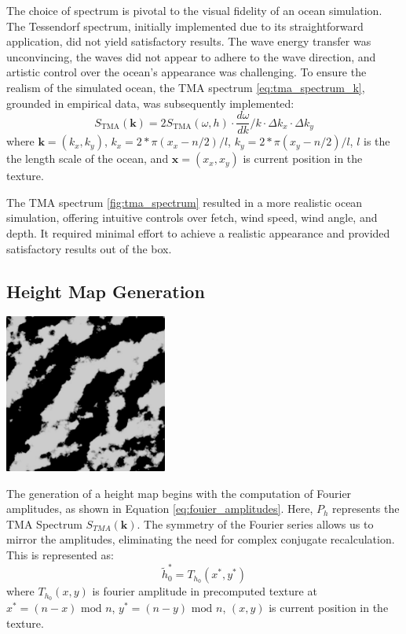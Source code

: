 The choice of spectrum is pivotal to the visual fidelity of an ocean simulation. The Tessendorf spectrum, initially implemented due to its straightforward application, did not yield satisfactory results. The wave energy transfer was unconvincing, the waves did not appear to adhere to the wave direction, and artistic control over the ocean's appearance was challenging. To ensure the realism of the simulated ocean, the TMA spectrum \ref{eq:tma_spectrum_k}, grounded in empirical data, was subsequently implemented:
$$
    S_{\text{TMA}}(\mathbf{k}) = 2S_{\text{TMA}}(\omega, h) \cdot \frac{d\omega}{dk} / k \cdot \Delta k_x \cdot \Delta k_y
$$
where $\mathbf{k} = (k_x, k_y)$, $k_x = 2 * \pi (x_x - n/2)/ l$, $k_y = 2 * \pi (x_y - n/2)/ l$, $l$ is the the length scale of the ocean, 
and $\mathbf{x} = (x_x, x_y)$ is current position in the texture. 

The TMA spectrum \ref{fig:tma_spectrum} resulted in a more realistic ocean simulation, offering intuitive controls over fetch, wind speed, wind angle, and depth. It required minimal effort to achieve a realistic appearance and provided satisfactory results out of the box.

\subsection{Height Map Generation}

\begin{minipage}{1\textwidth}
    \centering
    \includegraphics[width=0.40\textwidth]{"images/tma_height.png"}
    \label{fig:tma_height_map}
\end{minipage}

The generation of a height map begins with the computation of Fourier amplitudes, as shown in Equation \ref{eq:fouier_amplitudes}. Here, $P_h$ represents the TMA Spectrum $S_{TMA}(\mathbf{k})$.
The symmetry of the Fourier series allows us to mirror the amplitudes, eliminating the need for complex conjugate recalculation. This is represented as:
\begin{equation}
    \tilde{h}^{*}_0 = T_{h_0}(x^{*}, y^{*})
\end{equation}
where $T_{h_0}(x, y)$ is fourier amplitude in precomputed texture at $x^{*} = (n - x) \text{ mod } n$, $y^{*} = (n - y) \text{ mod } n$, $(x, y)$ is current position in the texture.

